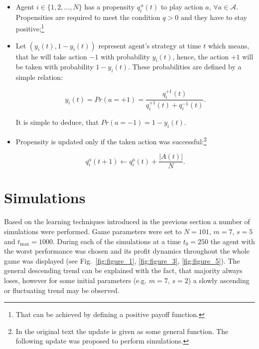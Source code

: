 \documentclass[12pt,american,czech]{article}
\begin{document}
\begin{itemize}

		\item Agent $i\in\{1,2,\dots,N\}$ has a propensity $q_{i}^{\,a}(t)$ to play action $a$, $\forall a\in\mathcal{A}$. Propensities are required to meet the condition $q>0$ and they have to stay positive;\footnote{That can be achieved by defining a positive payoff function.}
		\item Let $(y_{i}(t), 1-y_{i}(t))$ represent agent's strategy at time $t$ which means, that he will take action $-1$ with probability $y_{i}(t)$, hence, the action $+1$ will be taken with probability $1-y_{i}(t)$. These probabilities are defined by a simple relation:
		
\begin{equation}
y_{i}(t)=Pr(\mathit{a}=+1)=\frac{q_{i}^{\mathit{+1}}(t)}{q_{i}^{+1}(t)+q_{i}^{-1}(t)}.
\end{equation}

		It is simple to deduce, that $Pr(\mathit{a}=-1)=1-y_{i}(t)$.
		
		\item Propensity is updated only if the taken action was successful:\footnote{In the original text \cite{WHITEHEAD2008} the update is given as some general function. The following update was proposed to perform simulations.}
		
\begin{equation}
q_{i}^{\mathit{a}}(t+1) \leftarrow q_{i}^{\mathit{a}}(t) + \frac{|A(t)|}{N}.
\end{equation}
\end{itemize}

\section{Simulations}

Based on the learning techniques introduced in the previous section a number of simulations were performed. Game parameters were set to $N=101$, $m=7$, $s=5$ and $t_{\text{max}}=1000$. During each of the simulations at a time $t_{0}=250$ the agent with the worst performance was chosen and its profit dynamics throughout the whole game was displayed (see Fig.~\ref{fig:figure_1}, \ref{fig:figure_3}, \ref{fig:figure_5}). The general descending trend can be explained with the fact, that majority always loses, however for some initial parameters (e.g. $m=7$, $s=2$) a slowly ascending or fluctuating trend may be observed.

\medskip
\end{document}
